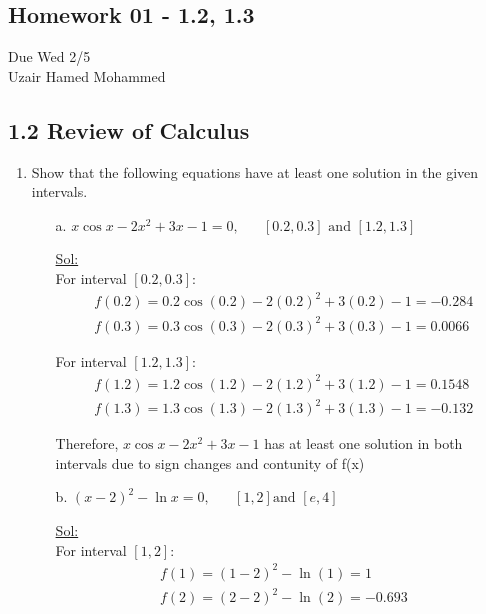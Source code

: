 \begin{center}
  \section*{Homework 01 - 1.2, 1.3}
  Due Wed 2/5 \\
  Uzair Hamed Mohammed
\end{center}

\subsection*{1.2 Review of Calculus}

\begin{enumerate}
  \item Show that the following equations have at least one solution
    in the given intervals.
    \begin{itemize}
      \item[a.] $x \cos x - 2x^2 + 3x -1 = 0, \hspace{20pt} [0.2,
        0.3] \textrm{ and } [1.2, 1.3]$

        \underline{Sol:} \\
        For interval $[0.2, 0.3]$:
        $$
        \begin{array}{l}
          f(0.2) = 0.2 \cos (0.2) - 2 (0.2)^2 + 3 (0.2) - 1 = -0.284 \\
          f(0.3) = 0.3 \cos (0.3) - 2 (0.3)^2 + 3 (0.3) - 1 = 0.0066
        \end{array}
        $$

        For interval $[1.2, 1.3]$:
        $$
        \begin{array}{l}
          f(1.2) = 1.2 \cos (1.2) - 2 (1.2)^2 + 3 (1.2) - 1 = 0.1548 \\
          f(1.3) = 1.3 \cos (1.3) - 2 (1.3)^2 + 3 (1.3) - 1 = -0.132
        \end{array}
        $$

        Therefore, $x \cos x - 2x^2 + 3x - 1$ has at least one
        solution in both intervals due to sign changes and contunity of f(x)

        \bigbreak

      \item[b.] $(x-2)^2 - \ln x = 0, \hspace{20pt} [1, 2] \textrm{
        and } [e, 4]$

        \underline{Sol:}\\
        For interval $[1, 2]$:
        $$
        \begin{array}{l}
          f(1) = (1-2)^2 - \ln(1) = 1 \\
          f(2) = (2-2)^2 - \ln(2) = -0.693
        \end{array}
        $$


\end{itemize}
\end{enumerate}
